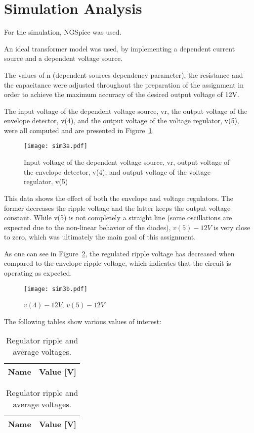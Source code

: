 \section{Simulation Analysis}
\label{sec:simulation}

For the simulation, NGSpice was used.

An ideal transformer model was used, by implementing a dependent current source and a dependent voltage source. 

The values of n (dependent sources dependency parameter), the resistance and the capacitance were adjusted throughout the preparation of the assignment in order to achieve the maximum accuracy of the desired output voltage of 12V.

The input voltage of the dependent voltage source, vr, the output voltage of the envelope detector, v(4), and the output voltage of the voltage regulator, v(5), were all computed and are presented in Figure~\ref{fig:sim3a}.


\begin{figure}[h] \centering
\texttt{[image: sim3a.pdf]}
	\caption{Input voltage of the dependent voltage source, vr, output voltage of the envelope detector, v(4), and output voltage of the voltage regulator, v(5)}
\label{fig:sim3a}
\end{figure}


This data shows the effect of both the envelope and voltage regulators. The former decreases the ripple voltage and the latter keeps the output voltage constant. While v(5) is not completely a straight line (some oscillations are expected due to the non-linear behavior of the diodes), $v(5) - 12V$ is very close to zero, which was ultimately the main goal of this assignment. 

As one can see in Figure~\ref{fig:sim3b}, the regulated ripple voltage has decreased when compared to the envelope ripple voltage, which indicates that the circuit is operating as expected. 

\begin{figure}[h] \centering
\texttt{[image: sim3b.pdf]}
	\caption{$v(4)-12V$, $v(5)-12V$}                        
\label{fig:sim3b} 
\end{figure}

The following tables show various values of interest:

\begin{table}[h]
        \parbox{.45\linewidth}{
  \centering
  \begin{tabular}{|l|r|}
    \hline
    {\bf Name} & {\bf Value [V]} \\ \hline
    
  \end{tabular}
  \caption{Envelope ripple and average voltages.}
	\label{tab:env}
}
\hfill
        \parbox{.45\linewidth}{
  \centering
  \begin{tabular}{|l|r|}
    \hline
    {\bf Name} & {\bf Value [V]} \\ \hline
    
  \end{tabular}
  \caption{Regulator ripple and average voltages.}
  \label{tab:reg}
}
\end{table}




